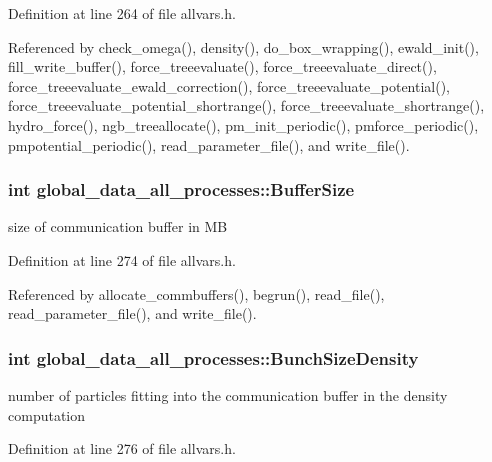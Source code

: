 Definition at line 264 of file allvars.h.



Referenced by check\_\-omega(), density(), do\_\-box\_\-wrapping(), ewald\_\-init(), fill\_\-write\_\-buffer(), force\_\-treeevaluate(), force\_\-treeevaluate\_\-direct(), force\_\-treeevaluate\_\-ewald\_\-correction(), force\_\-treeevaluate\_\-potential(), force\_\-treeevaluate\_\-potential\_\-shortrange(), force\_\-treeevaluate\_\-shortrange(), hydro\_\-force(), ngb\_\-treeallocate(), pm\_\-init\_\-periodic(), pmforce\_\-periodic(), pmpotential\_\-periodic(), read\_\-parameter\_\-file(), and write\_\-file().

\hypertarget{structglobal__data__all__processes_abd0120516eb7fee5a534464546fc5c7f}{
\subsubsection[{BufferSize}]{\setlength{\rightskip}{0pt plus 5cm}int {\bf global\_\-data\_\-all\_\-processes::BufferSize}}}
\label{structglobal__data__all__processes_abd0120516eb7fee5a534464546fc5c7f}
size of communication buffer in MB 

Definition at line 274 of file allvars.h.



Referenced by allocate\_\-commbuffers(), begrun(), read\_\-file(), read\_\-parameter\_\-file(), and write\_\-file().

\hypertarget{structglobal__data__all__processes_a9ab84bfa2f66ade551d613aeb3921d76}{
\subsubsection[{BunchSizeDensity}]{\setlength{\rightskip}{0pt plus 5cm}int {\bf global\_\-data\_\-all\_\-processes::BunchSizeDensity}}}
\label{structglobal__data__all__processes_a9ab84bfa2f66ade551d613aeb3921d76}
number of particles fitting into the communication buffer in the density computation 

Definition at line 276 of file allvars.h.



